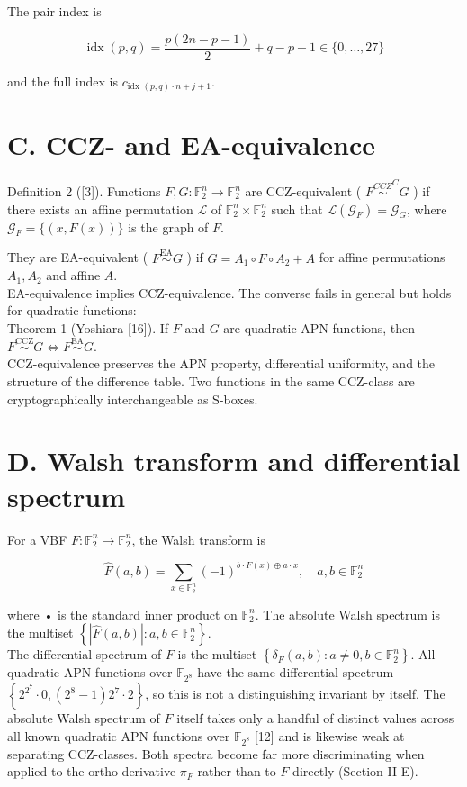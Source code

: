 \documentclass[10pt]{article}
\begin{document}
The pair index is

$$
\operatorname{idx}(p, q)=\frac{p(2 n-p-1)}{2}+q-p-1 \in\{0, \ldots, 27\}
$$

and the full index is $c_{\text {idx }(p, q) \cdot n+j+1}$.

\section*{C. CCZ- and EA-equivalence}
Definition 2 ([3]). Functions $F, G: \mathbb{F}_{2}^{n} \rightarrow \mathbb{F}_{2}^{n}$ are CCZ-equivalent ( $F \stackrel{C C Z}{\sim}^{C} G$ ) if there exists an affine permutation $\mathcal{L}$ of $\mathbb{F}_{2}^{n} \times \mathbb{F}_{2}^{n}$ such that $\mathcal{L}\left(\mathcal{G}_{F}\right)=\mathcal{G}_{G}$, where $\mathcal{G}_{F}=\{(x, F(x))\}$ is the graph of $F$.

They are EA-equivalent ( $F \stackrel{\mathrm{EA}}{\sim} G$ ) if $G=A_{1} \circ F \circ A_{2}+A$ for affine permutations $A_{1}, A_{2}$ and affine $A$.\\
EA-equivalence implies CCZ-equivalence. The converse fails in general but holds for quadratic functions:\\[0pt]
Theorem 1 (Yoshiara [16]). If $F$ and $G$ are quadratic APN functions, then $F \stackrel{\mathrm{CCZ}}{\sim} G \Leftrightarrow F \stackrel{\mathrm{EA}}{\sim} G$.\\
CCZ-equivalence preserves the APN property, differential uniformity, and the structure of the difference table. Two functions in the same CCZ-class are cryptographically interchangeable as S-boxes.

\section*{D. Walsh transform and differential spectrum}
For a VBF $F: \mathbb{F}_{2}^{n} \rightarrow \mathbb{F}_{2}^{n}$, the Walsh transform is

$$
\widehat{F}(a, b)=\sum_{x \in \mathbb{F}_{2}^{n}}(-1)^{b \cdot F(x) \oplus a \cdot x}, \quad a, b \in \mathbb{F}_{2}^{n}
$$

where • is the standard inner product on $\mathbb{F}_{2}^{n}$. The absolute Walsh spectrum is the multiset $\left\{|\widehat{F}(a, b)|: a, b \in \mathbb{F}_{2}^{n}\right\}$.\\
The differential spectrum of $F$ is the multiset $\left\{\delta_{F}(a, b): a \neq 0, b \in \mathbb{F}_{2}^{n}\right\}$. All quadratic APN functions over $\mathbb{F}_{2^{8}}$ have the same differential spectrum $\left\{2^{2^{7}} \cdot 0,\left(2^{8}-1\right) 2^{7} \cdot 2\right\}$, so this is not a distinguishing invariant by itself. The absolute Walsh spectrum of $F$ itself takes only a handful of distinct values across all known quadratic APN functions over $\mathbb{F}_{2^{8}}$ [12] and is likewise weak at separating CCZ-classes. Both spectra become far more discriminating when applied to the ortho-derivative $\pi_{F}$ rather than to $F$ directly (Section II-E).
\end{document}
